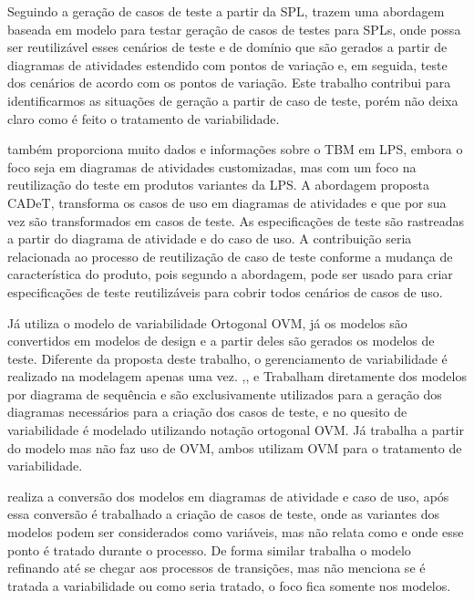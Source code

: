 Seguindo a geração de casos de teste a partir da SPL, \cite{cai2013model} trazem uma abordagem baseada em modelo para testar geração de casos de testes para SPLs, onde possa ser reutilizável esses cenários de teste e de domínio que são gerados a partir de diagramas de atividades estendido com pontos de variação e, em seguida, teste dos cenários de acordo com os pontos de variação. Este trabalho contribui para identificarmos as situações de geração a partir de caso de teste, porém não deixa claro como é feito o tratamento de variabilidade.

\cite{olimpiew2008model} também proporciona muito dados e informações sobre o TBM em LPS, embora o foco seja em diagramas de atividades customizadas, mas com um foco na reutilização do teste em produtos variantes da LPS. A abordagem proposta CADeT, transforma os casos de uso em diagramas de atividades e que por sua vez são transformados em casos de teste. As especificações de teste são rastreadas a partir do diagrama de atividade e do caso de uso. A contribuição seria relacionada ao processo de reutilização de caso de teste conforme a mudança de característica do produto, pois segundo a abordagem, pode ser usado para criar especificações de teste reutilizáveis para cobrir todos cenários de casos de uso.

Já \cite{lamancha2010model} utiliza o modelo de variabilidade Ortogonal OVM, já os modelos são convertidos em modelos de design e a partir deles são gerados os modelos de teste. Diferente da proposta deste trabalho, o gerenciamento de variabilidade é realizado na modelagem apenas uma vez. \cite{reales2011model},\cite{lochau2012parameterized}, e \cite{samih2012relating} Trabalham diretamente dos modelos por diagrama de sequência e são exclusivamente utilizados para a geração dos diagramas necessários para a criação dos casos de teste, e no quesito de variabilidade é modelado utilizando notação ortogonal OVM. Já \cite{weissleder2014evaluation} trabalha a partir do modelo mas não faz uso de OVM, ambos utilizam OVM para o tratamento de variabilidade.

\cite{hasling2008model} realiza a conversão dos modelos em diagramas de atividade e caso de uso, após essa conversão é trabalhado a criação de casos de teste, onde as variantes dos modelos podem ser considerados como variáveis, mas não relata como e onde esse ponto é tratado durante o processo. De forma similar \cite{gebizli2016successive} trabalha o modelo refinando até se chegar aos processos de transições, mas não menciona se é tratada a variabilidade ou como seria tratado, o foco fica somente nos modelos.

